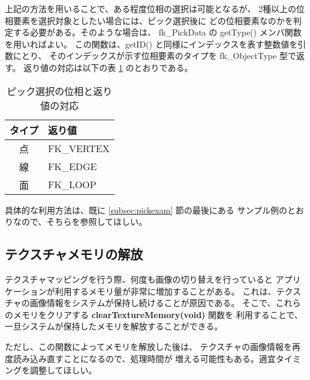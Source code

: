 上記の方法を用いることで、ある程度位相の選択は可能となるが、
2種以上の位相要素を選択対象としたい場合には、ピック選択後に
どの位相要素なのかを判定する必要がある。そのような場合は、
fk\_PickData の getType() メンバ関数を用いればよい。
この関数は、getID() と同様にインデックスを表す整数値を引数にとり、
そのインデックスが示す位相要素のタイプを fk\_ObjectType 型で返す。
返り値の対応は以下の表 \ref{tbl:picktype} のとおりである。

\begin{table}[H]
\caption{ピック選択の位相と返り値の対応}
\label{tbl:picktype}
\begin{center}
\begin{tabular}{|c|l|}
\hline
タイプ & 返り値 \\ \hline \hline
点 & FK\_VERTEX \\ \hline
線 & FK\_EDGE \\ \hline
面 & FK\_LOOP \\ \hline
\end{tabular}
\end{center}
\end{table}

具体的な利用方法は、既に \ref{subsec:pickexam} 節の最後にある
サンプル例のとおりなので、そちらを参照してほしい。

\subsection{テクスチャメモリの解放}
テクスチャマッピングを行う際、何度も画像の切り替えを行っていると
アプリケーションが利用するメモリ量が非常に増加することがある。
これは、テクスチャの画像情報をシステムが保持し続けることが原因である。
そこで、これらのメモリをクリアする \textbf{clearTextureMemory(void)} 関数を
利用することで、一旦システムが保持したメモリを解放することができる。

ただし、この関数によってメモリを解放した後は、
テクスチャの画像情報を再度読み込み直すことになるので、処理時間が
増える可能性もある。適宜タイミングを調整してほしい。

